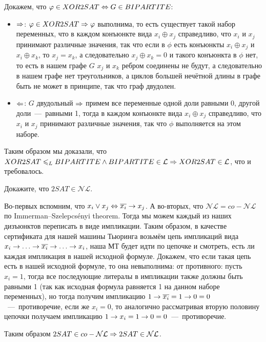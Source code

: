 \documentclass[a4paper,12pt]{article}
\begin{document}
\begin{solution}
\begin{enumerate}
	Докажем, что $\varphi \in XOR2SAT \Leftrightarrow G \in BIPARTITE$:
	\begin{itemize}
		\item $\Rightarrow$: $\varphi \in XOR2SAT \Rightarrow \varphi$ выполнима, то есть существует такой набор переменных, что в каждом конъюнкте вида $x_i \oplus x_j$ справедливо, что $x_i$ и $x_j$ принимают различные значения, так что если в $\phi$ есть конъюнкты $x_i \oplus x_j$ и $x_i \oplus x_k$, то $x_j = x_k$, а следовательно $x_j \oplus x_k = 0$ и такого конъюнкта в $\phi$ нет, то есть в нашем графе $G$ $x_j$ и $x_k$ ребром соединены не будут, а следовательно в нашем графе нет треугольников, а циклов большей нечётной длины в графе быть не может в принципе, так что граф двудолен.
		
		\item $\Leftarrow$: $G$ двудольный $\Rightarrow$ примем все переменные одной доли равными 0, другой доли~---~равными 1, тогда в каждом конъюнкте вида $x_i \oplus x_j$ справедливо, что $x_i$ и $x_j$ принимают различные значения, так что $\phi$ выполняется на этом наборе.
	\end{itemize}
	
	Таким образом мы доказали, что $XOR2SAT \leqslant_L BIPARTITE \wedge BIPARTITE \in \mathcal{L} \Rightarrow XOR2SAT \in \mathcal{L}$, что и требовалось.
	
	\end{enumerate}
\end{solution}

\begin{tasknum}{2}
	Докажите, что $2SAT \in \mathcal{NL}$.
\end{tasknum}

\begin{solution}
	Во-первых вспомним, что $x_i \vee x_j \Leftrightarrow \overline{x_i} \rightarrow x_j$. А во-вторых, что $\mathcal{NL} = co-\mathcal{NL}$ по Immerman–Szelepcsényi theorem. Тогда мы можем каждый из наших дизъюнктов переписать в виде импликации. Таким образом, в качестве сертификата для нашей машины Тьюринга возьмём цепь импликаций вида $x_i \rightarrow \ldots \rightarrow \overline{x_i} \rightarrow \ldots \rightarrow x_i$, наша МТ будет идти по цепочке и смотреть, есть ли каждая импликация в нашей исходной формуле. Докажем, что если такая цепь есть в нашей исходной формуле, то она невыполнима: от противного: пусть $x_i = 1$, тогда все последующие литералы в импликации также должны быть равными 1 (так как исходная формула равняется 1 на данном наборе переменных), но тогда получим импликацию $1 \rightarrow \overline{x_i} = 1 \rightarrow 0 = 0$~---~противоречие, если же $x_i = 0$, то аналогично рассматривая вторую половину цепочки получаем импликацию $1 \rightarrow x_i = 1 \rightarrow 0 = 0$~---~противоречие.
	
	Таким образом $2SAT \in co-\mathcal{NL} \Rightarrow 2SAT \in \mathcal{NL}$.
\end{solution}
\end{document}
